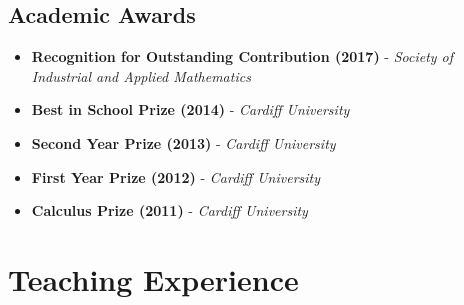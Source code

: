 \documentclass[10pt,a4paper,sans]{moderncv}        %
\begin{document}
	\vspace{10pt}
	
	\subsection{Academic Awards}
	
	\vspace{5pt}
	
		\begin{itemize}
			
			\item{\textbf{Recognition for Outstanding Contribution (2017)} - \small{\textit{Society of Industrial and Applied Mathematics}}}
			
			\vspace{6pt}
			
			\item{\textbf{Best in School Prize (2014)} - \small{\textit{Cardiff University}}}
			
			\vspace{6pt}
			
			\item{\textbf{Second Year Prize (2013)} - \small{\textit{Cardiff University}}}
			
			\vspace{6pt}
			
			\item{\textbf{First Year Prize (2012)} - \small{\textit{Cardiff University}}}
			
			\vspace{6pt}
			
			\item{\textbf{Calculus Prize (2011)} - \small{\textit{Cardiff University}}}
			
		\end{itemize}
	
	\vspace{10pt}
	
	\section{Teaching Experience}
	
	\vspace{10pt}
	
\end{document}

